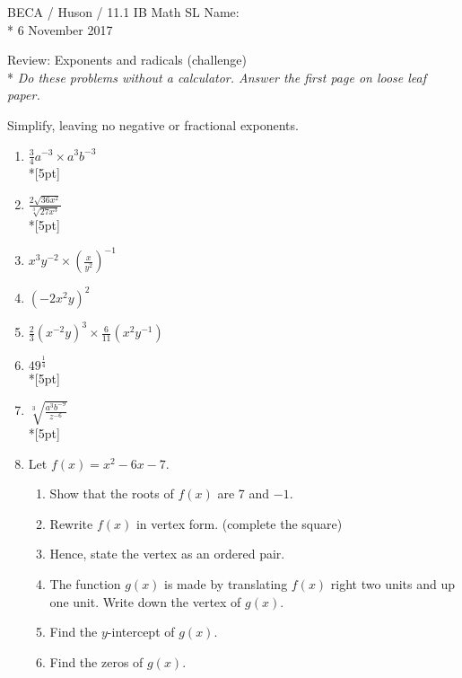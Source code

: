 \documentclass[]{book}
\begin{document}
\newpage 

\noindent BECA / Huson / 11.1 IB Math SL \hspace{2in} Name:\\*
6 November 2017
\begin{center}
{\Large Review: Exponents and radicals (challenge)}\\*
\textit{Do these problems without a calculator. Answer the first page on loose leaf paper.}
\end{center}

Simplify, leaving no negative or fractional exponents.

\begin{enumerate}

\item $\displaystyle \frac{3}{4} a^{-3} \times a^3 b^{-3}$ \\*[5pt]
\item $\displaystyle  \frac{2 \sqrt{36x^2}}{\sqrt[3]{27x^{3}}}$\\*[5pt]
\item $x^3 y^{-2} \times (\frac{x}{y^2})^{-1}$
\item $(-2x^2 y)^2$

\item $\displaystyle \frac{2}{3} (x^{-2} y)^3 \times \frac{6}{11}(x^2 y^{-1})$
\item $\displaystyle  49^\frac{1}{4}$\\*[5pt]
\item $\displaystyle  \sqrt[3]{\frac{a^3 b^{-9}}{z^{-6}}}$\\*[5pt]

\item Let $f(x) = x^2 -6x - 7$.
\begin{enumerate}
    \item Show that the roots of $f(x)$ are 7 and $-1$.
    \item Rewrite $f(x)$ in vertex form. (complete the square) %
    \item Hence, state the vertex as an ordered pair.
    \item The function $g(x)$ is made by translating $f(x)$ right two units and up one unit. Write down the vertex of $g(x)$.
        \item Find the $y$-intercept of $g(x)$.
    \item Find the zeros of $g(x)$.
\end{enumerate}


\end{enumerate}
\end{document}
